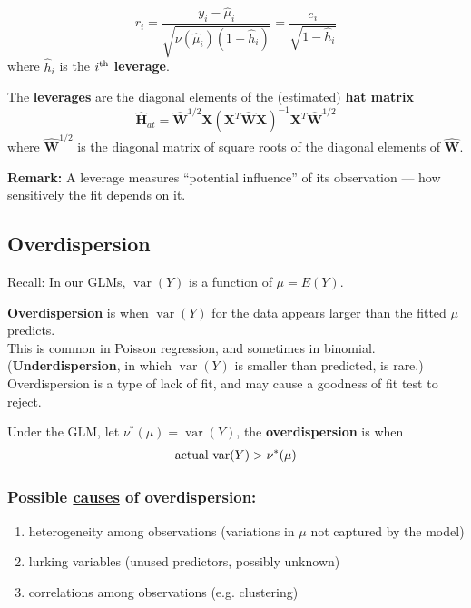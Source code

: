 \documentclass[11pt]{elegantbook}
\begin{document}
\begin{definition}
    \normalfont
    $$
    r_i=\frac{y_i-\hat{\mu}_i}{\sqrt{\nu\left(\hat{\mu}_i\right)\left(1-\hat{h}_i\right)}}=\frac{e_i}{\sqrt{1-\hat{h}_i}}
    $$
    where $\hat{h}_i$ is the $i^\textnormal{th}$ \textbf{leverage}.

    The \textbf{leverages} are the diagonal elements of the (estimated) \textbf{hat matrix}
    $$
    \hat{\boldsymbol{H}}_{a t}=\hat{\boldsymbol{W}}^{1 / 2} \boldsymbol{X}\left(\boldsymbol{X}^T \hat{\boldsymbol{W}} \boldsymbol{X}\right)^{-1} \boldsymbol{X}^T \hat{\boldsymbol{W}}^{1 / 2}
    $$
    where $\hat{\boldsymbol{W}}^{1 / 2}$ is the diagonal matrix of square roots of the diagonal elements of $\hat{\boldsymbol{W}}$.
\end{definition}
\textbf{Remark:} A leverage measures “potential influence” of its observation — how sensitively the fit depends on it.

\subsection{Overdispersion}
Recall: In our GLMs, $\operatorname{var}(Y)$ is a function of $\mu=E(Y)$.
\begin{definition}[Overdispersion]
    \normalfont
    \textbf{Overdispersion} is when $\operatorname{var}(Y)$ for the data appears larger than the fitted $\mu$ predicts.\\
    This is common in Poisson regression, and sometimes in binomial.\\
    (\textbf{Underdispersion}, in which $\operatorname{var}(Y)$ is smaller than predicted, is rare.)\\
    Overdispersion is a type of lack of fit, and may cause a goodness of fit test to reject.
\end{definition}
Under the GLM, let $\nu^*(\mu)=\operatorname{var}(Y)$, the \textbf{overdispersion} is when
\begin{equation}
    \begin{aligned}
        \textnormal{actual var}(Y)>\nu^*(\mu)
    \end{aligned}
    \nonumber
\end{equation}

\subsubsection*{Possible \underline{causes} of overdispersion:}
\begin{enumerate}
    \item heterogeneity among observations (variations in $\mu$ not captured by the model)
    \item lurking variables (unused predictors, possibly unknown)
    \item correlations among observations (e.g. clustering)
\end{enumerate}
\end{document}
